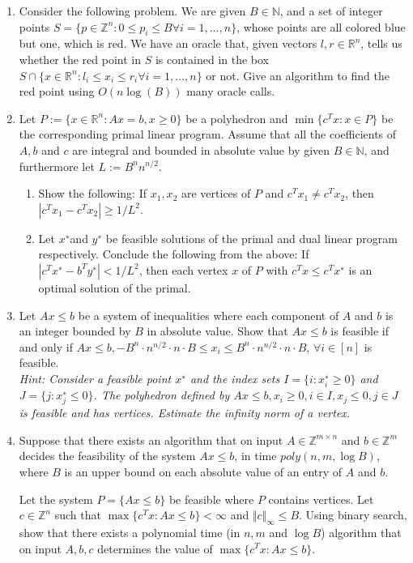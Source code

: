 \documentclass[11pt]{article}
\institute{\'Ecole Polytechnique F\'ed\'erale de Lausanne}
\newcommand{\setR}{\mathbb{R}}
\newcommand{\setZ}{\mathbb{Z}}
\newcommand{\setN}{\mathbb{N}}
\renewcommand{\leq}{\leqslant}
\begin{document}
\makeheader

\begin{enumerate}[1)]

\item Consider the following problem. We are given $B ∈\mathbb{N}$, and a set of integer points $S= \{p ∈\setZ^n :
0 ≤p_i ≤B ∀ i = 1,...,n\}$, whose points are all colored blue but one, which is red. We have an
oracle that, given vectors $l,r ∈\setR^n$, tells us whether the red point in $S$ is contained in the box
$S∩\{x ∈\setR^n : l_i ≤x_i ≤r_i ∀i = 1,...,n\}$ or not. Give an algorithm to find the red point using
$O(n \log(B))$ many oracle calls.



\item Let $P := \{x ∈\setR^n : Ax= b, x ≥0\}$ be a polyhedron and $\min\{c^Tx : x ∈P\}$ be the corresponding
primal linear program. Assume that all the coeﬃcients of $A, b$ and $c$ are integral and bounded in
absolute value by given $B ∈\setN$, and furthermore let $L:= B^n n^{n/2}$.
\begin{enumerate}
\item Show the following: If $x_1,x_2$ are vertices of $P$ and $c^Tx_1\neq c^Tx_2$, then $|c^Tx_1−c^Tx_2|≥1/L^2$.
\item  Let $x^∗$and $y^∗$ be feasible solutions of the primal and dual linear program respectively. Conclude
the following from the above: If $|c^Tx^∗ −b^Ty^∗|<1/L^2$, then each vertex $x$ of $P$ with $c^Tx≤c^Tx^∗$ is
an optimal solution of the primal.
\end{enumerate}




\item Let $Ax≤b$ be a system of inequalities where each component of $A$ and $b$ is an integer bounded by
$B$ in absolute value. Show that $Ax≤b$ is feasible if and only if $Ax≤b ,−B^n \cdot n^{n/2}\cdot n\cdot B ≤x_i ≤ B^n\cdot n^{n/2}\cdot n\cdot B$, $∀i∈[n]$ is feasible. \\

\textit{Hint: Consider a feasible point $x^∗$ and the index sets $I= \{i: x^∗_i ≥0\}$ and $J= \{j : x^∗_j ≤0\}$. The
polyhedron defined by $Ax≤b, x_i ≥0, i∈I, x_j ≤0, j ∈J$ is feasible and has vertices. Estimate the infinity norm of a vertex.}



\item Suppose that there exists an algorithm that on input $A ∈\setZ^{m×n}$ and $b ∈\setZ^m$ decides
the feasibility of the system $Ax≤b$, in time $poly(n,m,\log B)$, where $B$ is an upper bound on each
absolute value of an entry of $A$ and $b$. 


Let the system $P = \{Ax ≤b\}$ be feasible where $P$ contains vertices. Let $c ∈\setZ^n$ such that $\max\{c^Tx : Ax ≤b\}< \infty$ and $\Vert c \Vert_\infty \leq B$. Using binary search, show that there exists a polynomial time (in $n,m$ and $\log B$) algorithm that on input $A,b,c$ determines the value of $\max\{c^Tx: Ax≤b\}$.



\end{enumerate}



  
\end{document}
